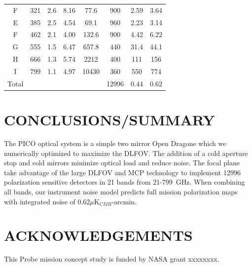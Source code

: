 \documentclass[]{spie}  %
\begin{document}
\begin{table}[ht]
\begin{tabular}{|c|c|c|c|c|c|c|c|}
F     & 321 & 2.6  & 8.16  & 77.6    & 900   & 2.59   & 3.64   \\
E     & 385 & 2.5  & 4.54  & 69.1    & 960   & 2.23   & 3.14   \\
F     & 462 & 2.1  & 4.00  & 132.6   & 900   & 4.42   & 6.22   \\
G     & 555 & 1.5  & 6.47  & 657.8   & 440   & 31.4  & 44.1  \\
H     & 666 & 1.3  & 5.74  & 2212    & 400   & 111 & 156 \\
I     & 799 & 1.1  & 4.97  & 10430   & 360   & 550 & 774 \\ 
\hline
Total &     &      &       &         & 12996 & 0.44   & 0.62  \\
\hline
\end{tabular}
\end{table}


\section{CONCLUSIONS/SUMMARY}

The PICO optical system is a simple two mirror Open Dragone which we numerically optimized to maximize the DLFOV.  The addition of a 
cold aperture stop and cold mirrors minimize optical load and reduce noise.  The focal plane take advantage of the large DLFOV and MCP 
technology to implement 12996 polarization sensitive detectors in 21 bands from 21-799~GHz.  When combining all bands, our instrument 
noise model predicts full mission polarization maps with integrated noise of 0.62$\mu$K$_{CMB}$-arcmin.






\section{ACKNOWLEDGEMENTS}

This Probe mission concept study is funded by NASA grant xxxxxxxx.


\end{document}
